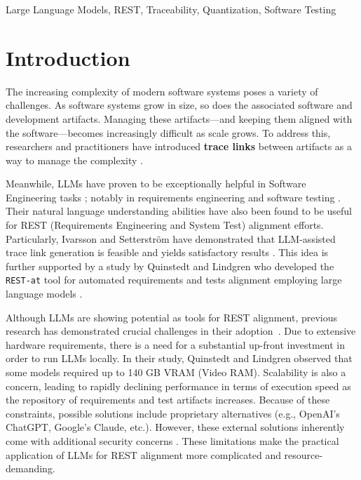 \documentclass[conference]{IEEEtran}
\begin{document}
\begin{IEEEkeywords}
Large Language Models, REST, Traceability, Quantization, Software Testing
\end{IEEEkeywords}


\section{Introduction}\label{sec:intro}

The increasing complexity of modern software systems poses a variety of challenges. As software systems grow in size, so does the associated software and development artifacts. Managing these artifacts---and keeping them aligned with the software---becomes increasingly difficult as scale grows. To address this, researchers and practitioners have introduced \textbf{trace links} between artifacts as a way to manage the complexity \cite{jaber2013Effect}. 

Meanwhile, LLMs have proven to be exceptionally helpful in Software Engineering tasks \cite{naveed2024Comprehensive}; notably in requirements engineering \cite{arora2024Advancing} and software testing \cite{dakhel2024Effective, wang2024Software}. Their natural language understanding abilities have also been found to be useful for REST (Requirements Engineering and System Test) alignment efforts. Particularly, Ivarsson and Setterström have demonstrated that LLM-assisted trace link generation is feasible and yields satisfactory results \cite{ivarsson2023automated}. This idea is further supported by a study by Quinstedt and Lindgren who developed the \verb|REST-at| tool for automated requirements and tests alignment employing large language models \cite{quinstedt2024Optimizing}.

Although LLMs are showing potential as tools for REST alignment, previous research has demonstrated crucial challenges in their adoption~\cite{quinstedt2024Optimizing}. Due to extensive hardware requirements, there is a need for a substantial up-front investment in order to run LLMs locally. In their study, Quinstedt and Lindgren observed that some models required up to 140 GB VRAM (Video RAM). Scalability is also a concern, leading to rapidly declining performance in terms of execution speed as the repository of requirements and test artifacts increases. Because of these constraints, possible solutions include proprietary alternatives (e.g., OpenAI's ChatGPT, Google's Claude, etc.). However, these external solutions inherently come with additional security concerns \cite{quinstedt2024Optimizing}. These limitations make the practical application of LLMs for REST alignment more complicated and resource-demanding.
\end{document}
